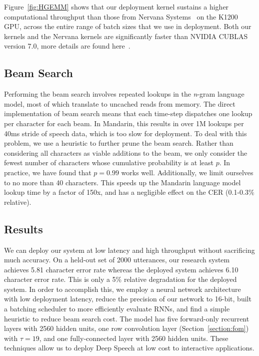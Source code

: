 \documentclass{article}
\begin{document}
Figure~\ref{fig:HGEMM} shows that our deployment kernel sustains a higher computational throughput than those from Nervana Systems~\cite{NervanaGPU} on the K1200 GPU, across the entire range of batch sizes that we use in deployment. Both our kernels and the Nervana kernels are significantly faster than NVIDIA CUBLAS version 7.0, more details are found here~\cite{Elsen2015}.

\subsection{Beam Search}

Performing the beam search involves repeated lookups in the \emph{n}-gram language model, most of which translate to uncached reads from memory. The direct implementation of beam search means that each time-step dispatches one lookup per character for each beam. In Mandarin, this results in over 1M lookups per 40ms stride of speech data, which is too slow for deployment. To deal with this problem, we use a heuristic to further prune the beam search. Rather than considering all characters as viable additions to the beam, we only consider the fewest number of characters whose cumulative probability is at least $p$. In practice, we have found that $p=0.99$ works well. Additionally, we limit ourselves to no more than 40 characters. This speeds up the Mandarin language model lookup time by a factor of 150x, and has a negligible effect on the CER (0.1-0.3\% relative).

\subsection{Results}

We can deploy our system at low latency and high throughput without sacrificing much accuracy. On a held-out set of 2000 utterances, our research system achieves 5.81 character error rate whereas the deployed system achieves 6.10 character error rate. This is only a 5\% relative degradation for the deployed system. In order to accomplish this, we employ a neural network architecture with low deployment latency, reduce the precision of our network to 16-bit, built a batching scheduler to more efficiently evaluate RNNs, and find a simple heuristic to reduce beam search cost. The model has five forward-only recurrent layers with 2560 hidden units, one row convolution layer (Section~\ref{section:fom}) with $\tau=19$, and one fully-connected layer with 2560 hidden units. These techniques allow us to deploy Deep Speech at low cost to interactive applications.
\end{document}
